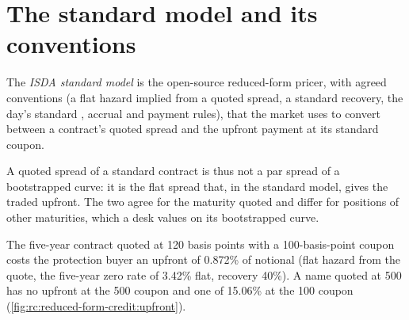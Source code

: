 \section{The standard model and its conventions}

\begin{definition}\label{def:rc:reduced-form-credit:isda}
The \emph{ISDA standard model} is the open-source
reduced-form pricer, with agreed conventions (a flat hazard implied from a quoted
spread, a standard recovery, the day's standard , accrual and payment
rules), that the market uses to convert between a contract's quoted spread and the
upfront payment at its standard coupon.
\end{definition}

A quoted spread of a standard contract is thus not a par spread of a bootstrapped curve:
it is the flat spread that, in the standard model, gives the traded upfront. The two
agree for the maturity quoted and differ for positions of other maturities, which a
desk values on its bootstrapped curve.

\begin{example}\label{ex:rc:reduced-form-credit:upfront}
The five-year contract quoted at 120 basis points with a 100-basis-point coupon costs
the protection buyer an upfront of 0.872\% of notional (flat hazard from the quote, the
five-year zero rate of 3.42\% flat, recovery 40\%). A name quoted at 500 has no upfront at
the 500 coupon and one of 15.06\% at the 100 coupon (\cref{fig:rc:reduced-form-credit:upfront}).
\end{example}

\begin{omfigure}

\label{fig:rc:reduced-form-credit:upfront}
\end{omfigure}

